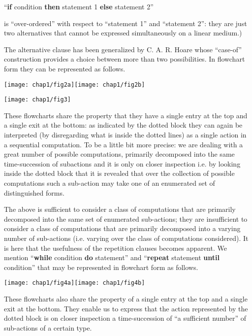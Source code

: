 {
	\setlength{\parindent}{8em}
	\hspace{-.4em}``\textbf{if} condition \textbf{then} statement 1 \textbf{else} statement 2''
}
\medskip

\noindent
is ``over-ordered'' with respect to ``statement 1'' and ``statement 2'': they are just two alternatives that cannot be expressed simultaneously on a linear medium.)

The alternative clause has been generalized by C. A. R. Hoare whose ``case-of'' construction provides a choice between more than two possibilities. In flowchart form they can be represented as follows.

\centerline{\texttt{[image: chap1/fig2a]}\qquad \texttt{[image: chap1/fig2b]}}

\centerline{\texttt{[image: chap1/fig3]}}

These flowcharts share the property that they have a single entry at the top and a single exit at the bottom: as indicated by the dotted block they can again be interpreted (by disregarding what is inside the dotted lines) as a single action in a sequential computation. To be a little bit more precise: we are dealing with a great number of possible computations, primarily decomposed into the same time-succession of subactions and it is only on closer inspection \textemdash{}  i.e. by looking inside the dotted block \textemdash{}  that it is revealed that over the collection of possible computations such a sub-action may take one of an enumerated set of distinguished forms.

The above is sufficient to consider a class of computations that are primarily decomposed into the same set of enumerated sub-actions; they are insufficient to consider a class of computations that are primarily decomposed into a varying number of sub-actions (i.e. varying over the class of computations considered). It is here that the usefulness of the repetition clauses becomes apparent. We mention ``\textbf{while} condition \textbf{do} statement'' and ``\textbf{repeat} statement \textbf{until} condition'' that may be represented in flowchart form as follows.

\centerline{\texttt{[image: chap1/fig4a]}\qquad \texttt{[image: chap1/fig4b]}}

These flowcharts also share the property of a single entry at the top and a single exit at the bottom. They enable us to express that the action represented by the dotted block is on closer inspection a time-succession of ``a sufficient number'' of sub-actions of a certain type.


